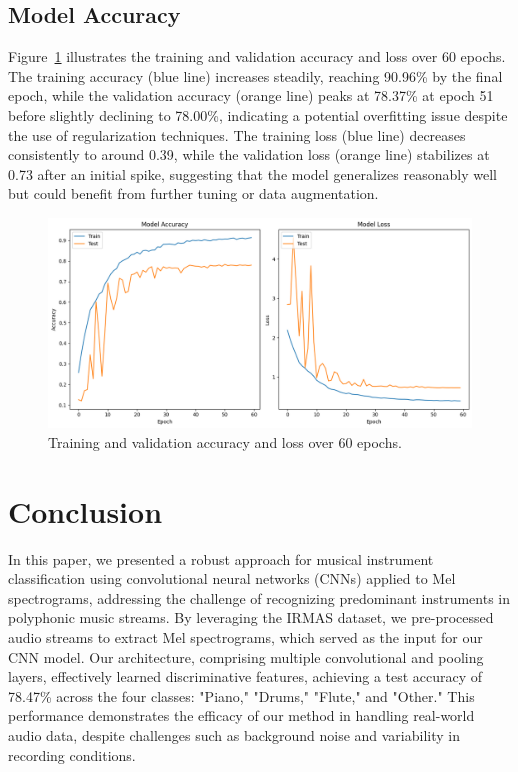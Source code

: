 \documentclass[conference]{IEEEtran}
\begin{document}
\subsection{Model Accuracy}
Figure~\ref{fig:accuracy_loss} illustrates the training and validation accuracy and loss over 60 epochs. The training accuracy (blue line) increases steadily, reaching 90.96\% by the final epoch, while the validation accuracy (orange line) peaks at 78.37\% at epoch 51 before slightly declining to 78.00\%, indicating a potential overfitting issue despite the use of regularization techniques. The training loss (blue line) decreases consistently to around 0.39, while the validation loss (orange line) stabilizes at 0.73 after an initial spike, suggesting that the model generalizes reasonably well but could benefit from further tuning or data augmentation.

\begin{figure}[h]
    \centering
    \includegraphics[width=0.9\columnwidth]{modelaccuracy.png}
    \caption{Training and validation accuracy and loss over 60 epochs.}
    \label{fig:accuracy_loss}
\end{figure}
\section{Conclusion}
In this paper, we presented a robust approach for musical instrument classification using convolutional neural networks (CNNs) applied to Mel spectrograms, addressing the challenge of recognizing predominant instruments in polyphonic music streams. By leveraging the IRMAS dataset, we pre-processed audio streams to extract Mel spectrograms, which served as the input for our CNN model. Our architecture, comprising multiple convolutional and pooling layers, effectively learned discriminative features, achieving a test accuracy of 78.47\% across the four classes: "Piano," "Drums," "Flute," and "Other." This performance demonstrates the efficacy of our method in handling real-world audio data, despite challenges such as background noise and variability in recording conditions.
\end{document}
